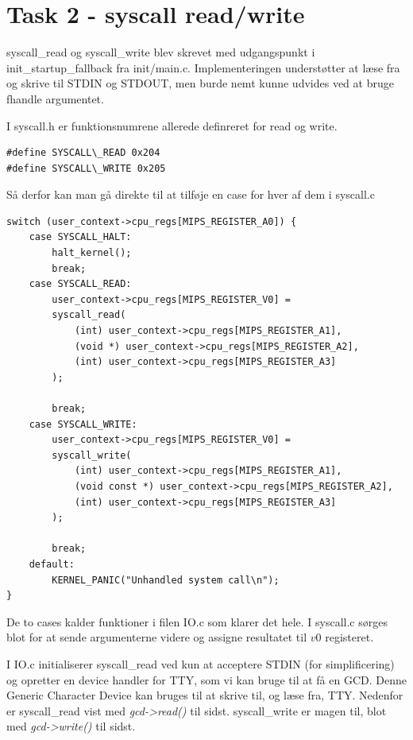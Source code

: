 \documentclass[11pt]{article}
\begin{document}
\section*{Task 2 - syscall read/write}

syscall\_read og syscall\_write blev skrevet med udgangspunkt i init\_startup\_fallback fra init/main.c. Implementeringen understøtter at læse fra og skrive til STDIN og STDOUT, men burde nemt kunne udvides ved at bruge fhandle argumentet.

I syscall.h er funktionsnumrene allerede definreret for read og write.
\begin{lstlisting}[style=customc]
#define SYSCALL\_READ 0x204
#define SYSCALL\_WRITE 0x205
\end{lstlisting}

Så derfor kan man gå direkte til at tilføje en case for hver af dem i syscall.c

\begin{lstlisting}[style=customc]
switch (user_context->cpu_regs[MIPS_REGISTER_A0]) {
    case SYSCALL_HALT:
        halt_kernel();
        break;
    case SYSCALL_READ:
        user_context->cpu_regs[MIPS_REGISTER_V0] =
        syscall_read(
            (int) user_context->cpu_regs[MIPS_REGISTER_A1],
            (void *) user_context->cpu_regs[MIPS_REGISTER_A2],
            (int) user_context->cpu_regs[MIPS_REGISTER_A3]
        );

        break;
    case SYSCALL_WRITE:
        user_context->cpu_regs[MIPS_REGISTER_V0] =
        syscall_write(
            (int) user_context->cpu_regs[MIPS_REGISTER_A1],
            (void const *) user_context->cpu_regs[MIPS_REGISTER_A2],
            (int) user_context->cpu_regs[MIPS_REGISTER_A3]
        );

        break;
    default:
        KERNEL_PANIC("Unhandled system call\n");
}
\end{lstlisting}

De to cases kalder funktioner i filen IO.c som klarer det hele. I syscall.c
sørges blot for at sende argumenterne videre og assigne resultatet til $v0$
registeret.

I IO.c initialiserer syscall\_read ved kun at acceptere STDIN (for simplificering)
og opretter en device handler for TTY, som vi kan bruge til at få en GCD. Denne
Generic Character Device kan bruges til at skrive til, og læse fra, TTY. Nedenfor
er syscall\_read vist med \emph{gcd->read()} til sidst. syscall\_write er magen til,
blot med \emph{gcd->write()} til sidst.
\end{document}
